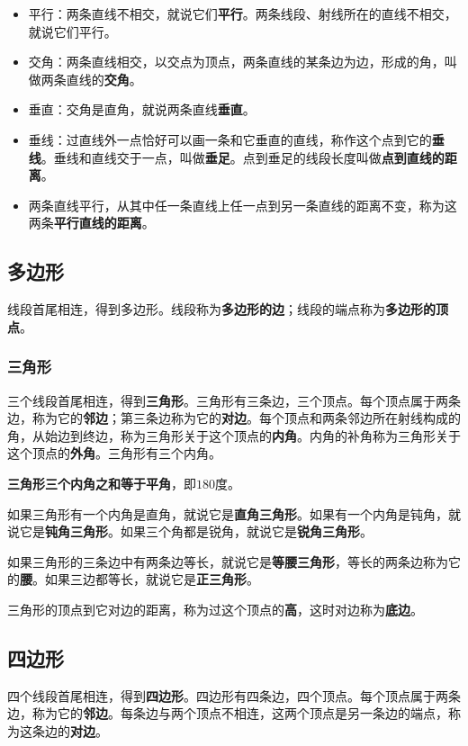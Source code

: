 \documentclass[12pt,UTF8]{ctexart}
\begin{document}
\begin{itemize}
\item 平行：两条直线不相交，就说它们\textbf{平行}。两条线段、射线所在的直线不相交，就说它们平行。
\item 交角：两条直线相交，以交点为顶点，两条直线的某条边为边，形成的角，叫做两条直线的\textbf{交角}。
\item 垂直：交角是直角，就说两条直线\textbf{垂直}。
\item 垂线：过直线外一点恰好可以画一条和它垂直的直线，称作这个点到它的\textbf{垂线}。垂线和直线交于一点，叫做\textbf{垂足}。点到垂足的线段长度叫做\textbf{点到直线的距离}。
\item 两条直线平行，从其中任一条直线上任一点到另一条直线的距离不变，称为这两条\textbf{平行直线的距离}。
\end{itemize}

\subsection{多边形}

线段首尾相连，得到多边形。线段称为\textbf{多边形的边}；线段的端点称为\textbf{多边形的顶点}。

\subsubsection{三角形}
三个线段首尾相连，得到\textbf{三角形}。三角形有三条边，三个顶点。每个顶点属于两条边，称为它的\textbf{邻边}；第三条边称为它的\textbf{对边}。每个顶点和两条邻边所在射线构成的角，从始边到终边，称为三角形关于这个顶点的\textbf{内角}。内角的补角称为三角形关于这个顶点的\textbf{外角}。三角形有三个内角。

\textbf{三角形三个内角之和等于平角}，即$180$度。

如果三角形有一个内角是直角，就说它是\textbf{直角三角形}。如果有一个内角是钝角，就说它是\textbf{钝角三角形}。如果三个角都是锐角，就说它是\textbf{锐角三角形}。

如果三角形的三条边中有两条边等长，就说它是\textbf{等腰三角形}，等长的两条边称为它的\textbf{腰}。如果三边都等长，就说它是\textbf{正三角形}。

三角形的顶点到它对边的距离，称为过这个顶点的\textbf{高}，这时对边称为\textbf{底边}。

\subsection{四边形}
四个线段首尾相连，得到\textbf{四边形}。四边形有四条边，四个顶点。每个顶点属于两条边，称为它的\textbf{邻边}。每条边与两个顶点不相连，这两个顶点是另一条边的端点，称为这条边的\textbf{对边}。
\end{document}
